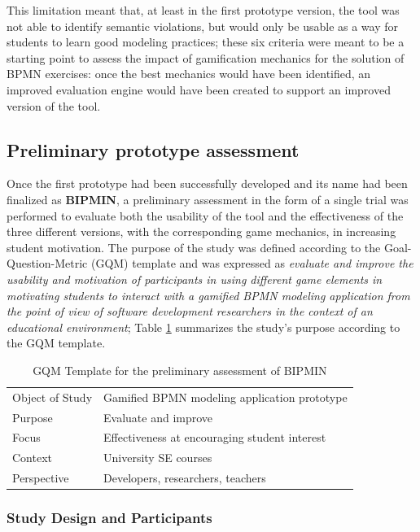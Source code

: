 This limitation meant that, at least in the first prototype version, the tool was not able to identify semantic violations, but would only be usable as a way for students to learn good modeling practices; these six criteria were meant to be a starting point to assess the impact of gamification mechanics for the solution of BPMN exercises: once the best mechanics would have been identified, an improved evaluation engine would have been created to support an improved version of the tool.

\subsection{Preliminary prototype assessment}

Once the first prototype had been successfully developed and its name had been finalized as \textbf{BIPMIN}, a preliminary assessment in the form of a single trial was performed to evaluate both the usability of the tool and the effectiveness of the three different versions, with the corresponding game mechanics, in increasing student motivation. The purpose of the study was defined according to the Goal-Question-Metric (GQM) template and was expressed as \emph{evaluate and improve the usability and motivation of participants in using different game elements in motivating students to interact with a gamified BPMN modeling application from the point of view of software development researchers in the context of an educational environment}; Table \ref{tab:gqm3_proto} summarizes the study's purpose according to the GQM template.

\begin{table}[ht]
\small
\centering
\caption{GQM Template for the preliminary assessment of BIPMIN}
\begin{tabular}{@{}p{} p{}@{}}
\toprule
Object of Study & Gamified BPMN modeling application prototype\\ 
Purpose & Evaluate and improve \\
Focus & Effectiveness at encouraging student interest \\
Context & University SE courses \\
Perspective & Developers, researchers, teachers \\ \bottomrule
\end{tabular}
\label{tab:gqm3_proto}
\end{table}

\subsubsection{Study Design and Participants}

